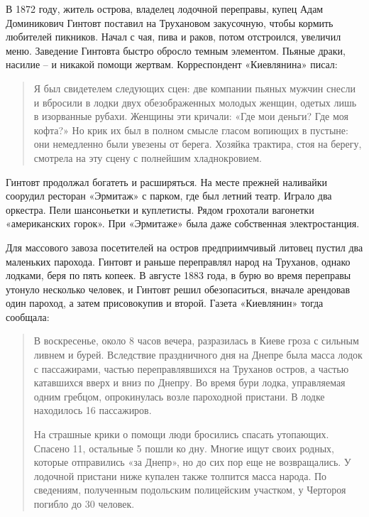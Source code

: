 В 1872 году, житель острова, владелец лодочной переправы, купец Адам Доминикович Гинтовт поставил на Трухановом закусочную, чтобы кормить любителей пикников. Начал с чая, пива и раков, потом отстроился, увеличил меню. Заведение Гинтовта быстро обросло темным элементом. Пьяные драки, насилие – и никакой помощи жертвам. Корреспондент «Киевлянина» писал:

\begin{quotation}
Я был свидетелем следующих сцен: две компании пьяных мужчин снесли и вбросили в лодки двух обезображенных молодых женщин, одетых лишь в изорванные рубахи. Женщины эти кричали: «Где мои деньги? Где моя кофта?» Но крик их был в полном смысле гласом вопиющих в пустыне: они немедленно были увезены от берега. Хозяйка трактира, стоя на берегу, смотрела на эту сцену с полнейшим хладнокровием.
\end{quotation}

Гинтовт продолжал богатеть и расширяться. На месте прежней наливайки соорудил ресторан «Эрмитаж» с парком, где был летний театр. Играло два оркестра. Пели шансоньетки и куплетисты. Рядом грохотали вагонетки «американских горок». При «Эрмитаже» была даже собственная электростанция.
 
Для массового завоза посетителей на остров предприимчивый литовец пустил два маленьких парохода. Гинтовт и раньше переправлял народ на Труханов, однако лодками, беря по пять копеек. В августе 1883 года, в бурю во время переправы утонуло несколько человек, и Гинтовт решил обезопаситься, вначале арендовав один пароход, а затем присовокупив и второй. Газета «Киевлянин» тогда сообщала:

\begin{quotation}
В воскресенье, около 8 часов вечера, разразилась в Киеве гроза с сильным ливнем и бурей. Вследствие праздничного дня на Днепре была масса лодок с пассажирами, частью переправлявшихся на Труханов остров, а частью катавшихся вверх и вниз по Днепру. Во время бури лодка, управляемая одним гребцом, опрокинулась возле пароходной пристани. В лодке находилось 16 пассажиров.

На страшные крики о помощи люди бросились спасать утопающих. Спасено 11, остальные 5 пошли ко дну. Многие ищут своих родных, которые отправились «за Днепр», но до сих пор еще не возвращались. У лодочной пристани ниже купален также толпится масса народа. По сведениям, полученным подольским полицейским участком, у Чертороя погибло до 30 человек.
\end{quotation}

